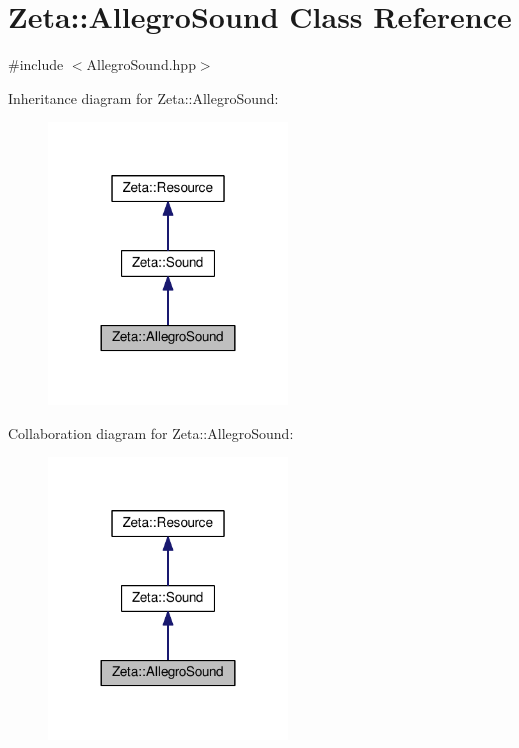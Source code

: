 \hypertarget{classZeta_1_1AllegroSound}{\section{Zeta\+:\+:Allegro\+Sound Class Reference}
\label{classZeta_1_1AllegroSound}
}


{\ttfamily \#include $<$Allegro\+Sound.\+hpp$>$}



Inheritance diagram for Zeta\+:\+:Allegro\+Sound\+:\nopagebreak
\begin{figure}[H]
\begin{center}
\leavevmode
\includegraphics[width=180pt]{classZeta_1_1AllegroSound__inherit__graph}
\end{center}
\end{figure}


Collaboration diagram for Zeta\+:\+:Allegro\+Sound\+:\nopagebreak
\begin{figure}[H]
\begin{center}
\leavevmode
\includegraphics[width=180pt]{classZeta_1_1AllegroSound__coll__graph}
\end{center}
\end{figure}
